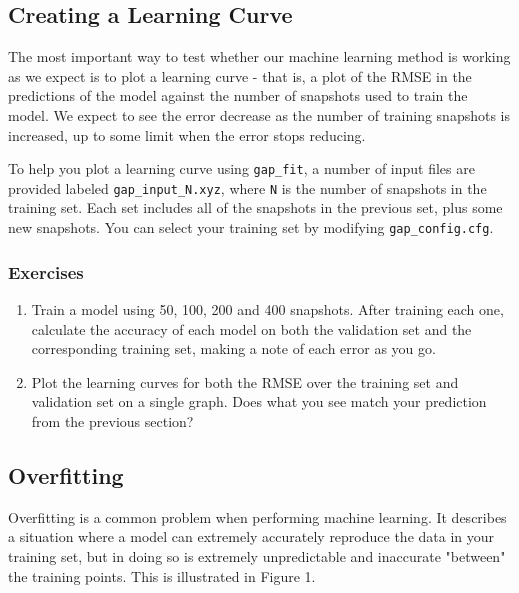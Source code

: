 \documentclass{article}
\begin{document}
\subsection{Creating a Learning Curve}

The most important way to test whether our machine learning method is working as we expect is to plot a learning curve - that is, a plot of the RMSE in the predictions of the model against the number of snapshots used to train the model. We expect to see the error decrease as the number of training snapshots is increased, up to some limit when the error stops reducing.

To help you plot a learning curve using \verb|gap_fit|, a number of input files are provided labeled \verb|gap_input_N.xyz|, where \verb|N| is the number of snapshots in the training set. Each set includes all of the snapshots in the previous set, plus some new snapshots. You can select your training set by modifying \verb|gap_config.cfg|.

\subsubsection*{Exercises}

\begin{enumerate}

\item Train a model using 50, 100, 200 and 400 snapshots. After training each one, calculate the accuracy of each model on both the validation set and the corresponding training set, making a note of each error as you go.
\item Plot the learning curves for both the RMSE over the training set and validation set on a single graph. Does what you see match your prediction from the previous section?

\end{enumerate}

\subsection{Overfitting}

Overfitting is a common problem when performing machine learning. It describes a situation where a model can extremely accurately reproduce the data in your training set, but in doing so is extremely unpredictable and inaccurate "between" the training points. This is illustrated in Figure 1.
\end{document}
